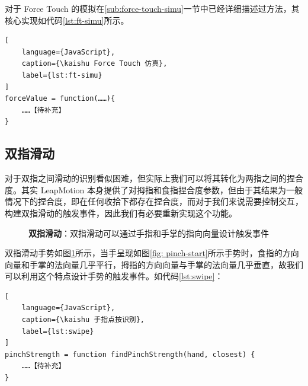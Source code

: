 对于 Force Touch 的模拟在\ref{sub:force-touch-simu}一节中已经详细描述过方法，其核心实现如代码\ref{lst:ft-simu}所示。
\begin{lstlisting}[
    language={JavaScript},
    caption={\kaishu Force Touch 仿真},
    label={lst:ft-simu}
]
forceValue = function(……){
    ……【待补充】
}
\end{lstlisting}

\subsection{双指滑动}

对于双指之间滑动的识别看似困难，但实际上我们可以将其转化为两指之间的捏合度。其实 LeapMotion 本身提供了对拇指和食指捏合度参数，但由于其结果为一般情况下的捏合度，即在任何收拾下都存在捏合度，而对于我们来说需要控制交互，构建双指滑动的触发事件，因此我们有必要重新实现这个功能。

\begin{figure}[H]
\kaishu
\centering
{}
\caption{\textbf{双指滑动}：双指滑动可以通过手指和手掌的指向向量设计触发事件}
\label{fig:pinch}
\end{figure}

双指滑动手势如图\ref{fig:pinch}所示，当手呈现如图\ref{fig: pinch-start}所示手势时，食指的方向向量和手掌的法向量几乎平行，拇指的方向向量与手掌的法向量几乎垂直，故我们可以利用这个特点设计手势的触发事件。如代码\ref{lst:swipe}：

\begin{lstlisting}[
    language={JavaScript},
    caption={\kaishu 手指点按识别},
    label={lst:swipe}
]
pinchStrength = function findPinchStrength(hand, closest) {
    ……【待补充】
}
\end{lstlisting}

